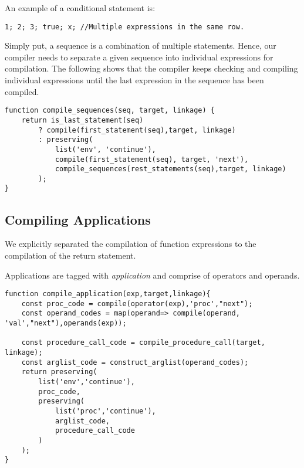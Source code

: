 An example of a conditional statement is:
\begin{lstlisting}[caption=Example of Sequences]
1; 2; 3; true; x; //Multiple expressions in the same row.
\end{lstlisting}

Simply put, a sequence is a combination of multiple statements. Hence, our compiler needs to separate a given sequence into individual expressions for compilation. The following shows that the compiler keeps checking and compiling individual expressions until the last expression in the sequence has been compiled.

\begin{lstlisting}[caption=Compile Sequences]
function compile_sequences(seq, target, linkage) {
    return is_last_statement(seq)
        ? compile(first_statement(seq),target, linkage)
        : preserving(
            list('env', 'continue'),
            compile(first_statement(seq), target, 'next'),
            compile_sequences(rest_statements(seq),target, linkage)
        );
}
\end{lstlisting}

\subsection{Compiling Applications}
We explicitly separated the compilation of function expressions to the compilation of the return statement.

Applications are tagged with \textit{application} and comprise of operators and operands.

\begin{lstlisting}[caption=Compile Sequences]
function compile_application(exp,target,linkage){
    const proc_code = compile(operator(exp),'proc',"next");
    const operand_codes = map(operand=> compile(operand, 'val',"next"),operands(exp));

    const procedure_call_code = compile_procedure_call(target, linkage);
    const arglist_code = construct_arglist(operand_codes);
    return preserving(
        list('env','continue'),
        proc_code,
        preserving(
            list('proc','continue'),
            arglist_code,
            procedure_call_code
        )
    );
}
\end{lstlisting}

